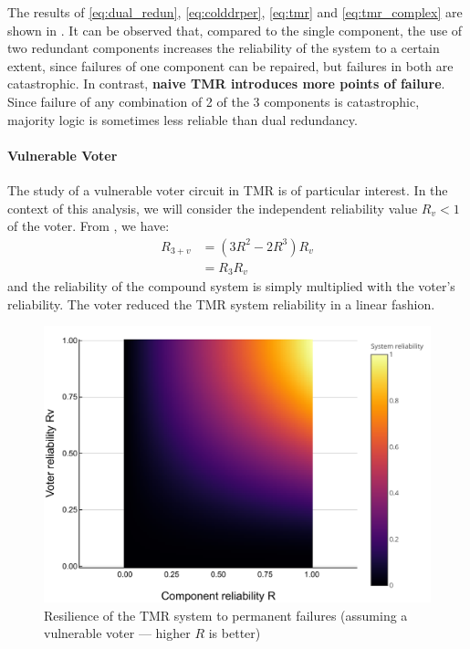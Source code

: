 \documentclass[a4paper,nobib,final]{tufte-book}
\def\acusepage#1{}
\begin{document}
The results of \eqref{eq:dual_redun}, \eqref{eq:colddrper}, \eqref{eq:tmr} and \eqref{eq:tmr_complex} are shown in . It can be observed that, compared to the single component, the use of two redundant components increases the reliability of the system to a certain extent, since failures of one component can be repaired, but failures in both are catastrophic. In contrast, \textbf{naive \acs{TMR} introduces more points of failure}. Since failure of any combination of 2 of the 3 components is catastrophic, majority logic is sometimes less reliable than dual redundancy.

\paragraph{\textbf{Vulnerable Voter}}\hspace{0pt}
\acusepage{voter}

The study of a vulnerable voter circuit in \acs{TMR} is of particular interest. In the context of this analysis, we will consider the independent reliability value \( R_v < 1 \) of the voter. From \autocite[31]{birolini_reliability_engineering_2004}, we have:
\begin{align}
R_{3+v} &= (3R^2 - 2R^3)R_v \nonumber \\
&= R_3R_v
\end{align}
and the reliability of the compound system is simply multiplied with the voter's reliability. The voter reduced the \acs{TMR} system reliability in a linear fashion.

\begin{figure}
	\centering
	\includegraphics{analysis/reliability_norepair_voter_en}
	\caption[Resilience of the TMR system to permanent failures (assuming a vulnerable voter)]{Resilience of the \acs{TMR} system to permanent failures (assuming a vulnerable voter --- higher \(R\) is better)}
	\label{fig:reliability_norepair_voter}
\end{figure}
\end{document}
